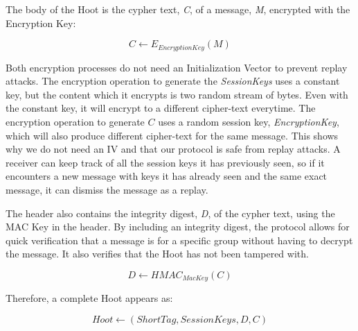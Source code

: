 The body of the Hoot is the cypher text, \textit{C}, of a message, \textit{M}, encrypted with the Encryption Key:

\begin{equation*}
	C \leftarrow E_{\mathit{EncryptionKey}}\left(M\right)
\end{equation*}

Both encryption processes do not need an Initialization Vector to prevent replay attacks. The encryption operation to generate the \textit{SessionKeys} uses a constant key, but the content which it encrypts is two random stream of bytes. Even with the constant key, it will encrypt to a different cipher-text everytime. The encryption operation to generate $C$ uses a random session key, \textit{EncryptionKey}, which will also produce different cipher-text for the same message. This shows why we do not need an IV and that our protocol is safe from replay attacks. A receiver can keep track of all the session keys it has previously seen, so if it encounters a new message with keys it has already seen and the same exact message, it can dismiss the message as a replay.

The header also contains the integrity digest, \textit{D}, of the cypher text, using the MAC Key in the header. By including an integrity digest, the protocol allows for quick verification that a message is for a specific group without having to decrypt the message. It also verifies that the Hoot has not been tampered with. 

\begin{equation*}
	D \leftarrow \mathit{HMAC}_{\mathit{MacKey}}\left(C\right)
\end{equation*}

Therefore, a complete Hoot appears as:

\begin{equation*}
	\mathit{Hoot} \leftarrow \left(\mathit{ShortTag},\mathit{SessionKeys},D,C\right)
\end{equation*}